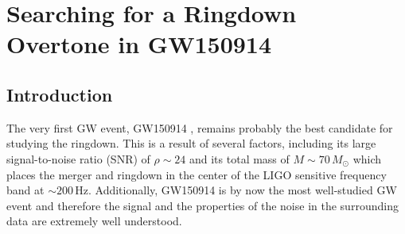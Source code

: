 

\chapter{Searching for a Ringdown Overtone in GW150914}

\label{Chapter4}

\section{Introduction}\label{ch4:sec:introduction}


The very first GW event, GW150914 \cite{LIGOScientific:2016aoc}, remains probably the best candidate for studying the ringdown.
This is a result of several factors, including its large signal-to-noise ratio (SNR) of $\rho\sim 24$ and its total mass of $M\sim 70\,M_\odot$ which places the merger and ringdown in the center of the LIGO \cite{LIGOScientific:2014pky} sensitive frequency band at $\sim 200\,\mathrm{Hz}$. 
Additionally, GW150914 is by now the most well-studied GW event and therefore the signal and the properties of the noise in the surrounding data are extremely well understood.

